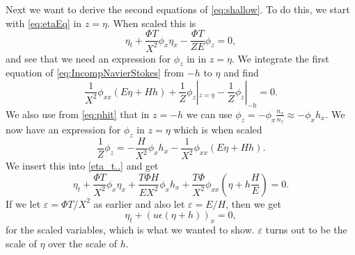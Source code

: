 \documentclass[12pt]{article}
\begin{document}
Next we want to derive the second equations of \eqref{eq:shallow}. To do this, we start with \eqref{eq:etaEq} in $z = \eta$. When scaled this is 
\begin{equation}
    \label{eta_t..}
    \eta_t + \frac{\Phi T}{X^2}\phi_x\eta_x - \frac{\Phi T}{ZE}\phi_z = 0,
\end{equation}
and see that we need an expression for $\phi_z$ in in $z = \eta$. We integrate the first equation of \eqref{eq:IncompNavierStokes} from $-h$ to $\eta$ and find 
\begin{equation*}    
    \frac{1}{X^2}\phi_{xx}(E\eta + Hh) + \frac{1}{Z}\phi_z|_{z=\eta} - \frac{1}{Z}\phi_z|_{-h} = 0.
\end{equation*}
We also use from \eqref{eq:phit} that in $z = -h$ we can use $\phi_z = -\phi_x\frac{n_x}{n_z} \approx -\phi_x h_x$. We now have an expression for $\phi_z$ in $z = \eta$ which is when scaled
\begin{equation*}
    \frac{1}{Z}\phi_z = - \frac{H}{X^2}\phi_x h_x - \frac{1}{X^2}\phi_{xx}(E\eta + Hh).
\end{equation*}
We insert this into \eqref{eta_t..} and get
\begin{equation} 
    \eta_t + \frac{\Phi T}{X^2}\phi_x\eta_x + \frac{T\Phi H}{EX^2}\phi_x h_x + \frac{T\Phi}{X^2}\phi_{xx}(\eta + h\frac{H}{E}) = 0.
\end{equation}
If we let $\varepsilon = \Phi T/X^2 $ as earlier and also let $\varepsilon = E/H$, then we get
\begin{equation*}
    \eta_t + (u\epsilon(\eta + h))_x = 0,
\end{equation*}
for the scaled variables, which is what we wanted to show. $\varepsilon$ turns out to be the scale of $\eta$ over the scale of $h$.
\end{document}
